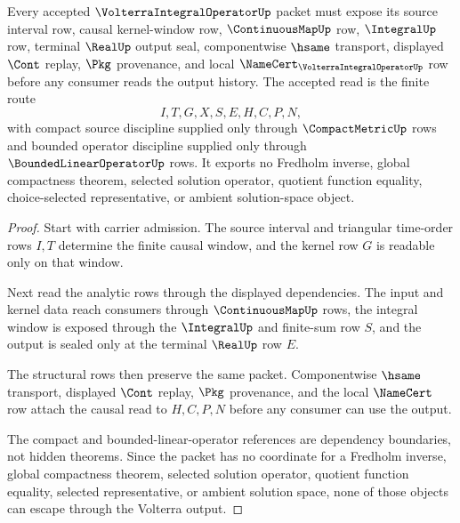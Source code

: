 \begin{theorem}
\label{thm:volterra-integral-operator-causal-nonescape}
Every accepted $\VolterraIntegralOperatorUp$ packet must expose its source interval row, causal kernel-window row, $\ContinuousMapUp$ row, $\IntegralUp$ row, terminal $\RealUp$ output seal, componentwise $\hsame$ transport, displayed $\Cont$ replay, $\Pkg$ provenance, and local $\NameCert_{\VolterraIntegralOperatorUp}$ row before any consumer reads the output history. The accepted read is the finite route
$$
I,T,G,X,S,E,H,C,P,N ,
$$
with compact source discipline supplied only through $\CompactMetricUp$ rows and bounded operator discipline supplied only through $\BoundedLinearOperatorUp$ rows. It exports no Fredholm inverse, global compactness theorem, selected solution operator, quotient function equality, choice-selected representative, or ambient solution-space object.
\end{theorem}
\begin{proof}
Start with carrier admission. The source interval and triangular time-order rows $I,T$ determine the finite causal window, and the kernel row $G$ is readable only on that window.

Next read the analytic rows through the displayed dependencies. The input and kernel data reach consumers through $\ContinuousMapUp$ rows, the integral window is exposed through the $\IntegralUp$ and finite-sum row $S$, and the output is sealed only at the terminal $\RealUp$ row $E$.

The structural rows then preserve the same packet. Componentwise $\hsame$ transport, displayed $\Cont$ replay, $\Pkg$ provenance, and the local $\NameCert$ row attach the causal read to $H,C,P,N$ before any consumer can use the output.

The compact and bounded-linear-operator references are dependency boundaries, not hidden theorems. Since the packet has no coordinate for a Fredholm inverse, global compactness theorem, selected solution operator, quotient function equality, selected representative, or ambient solution space, none of those objects can escape through the Volterra output.
\end{proof}


